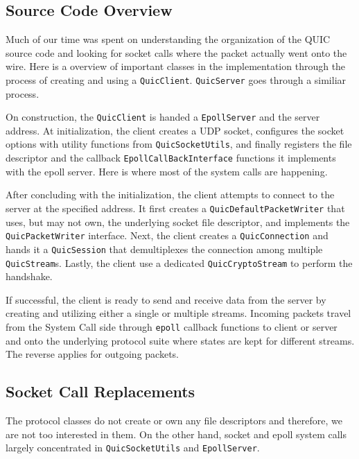 \documentclass{sig-alternate-05-2015}
\begin{document}
\subsection{Source Code Overview}
Much of our time was spent on understanding the organization of the QUIC source code and looking for socket calls where the packet actually went onto the wire. Here is a overview of important classes in the implementation through the process of creating and using a \texttt{QuicClient}. \texttt{QuicServer} goes through a similiar process.

On construction, the \texttt{QuicClient} is handed a \texttt{EpollServer} and the server address. At initialization, the client creates a UDP socket, configures the socket options with utility functions from \texttt{QuicSocketUtils}, and finally registers the file descriptor and the callback \texttt{EpollCallBackInterface} functions it implements with the epoll server. Here is where most of the system calls are happening. 

After concluding with the initialization, the client attempts to connect to the server at the specified address. It first creates a                   \texttt{QuicDefaultPacketWriter} that uses, but may not own, the underlying socket file descriptor, and implements the \texttt{QuicPacketWriter} interface. Next, the client creates a \texttt{QuicConnection} and hands it a \texttt{QuicSession} that demultiplexes the connection among multiple \texttt{QuicStream}s. Lastly, the client use a dedicated \texttt{QuicCryptoStream} to perform the handshake.

If successful, the client is ready to send and receive data from the server by creating and utilizing either a single or multiple streams. Incoming packets travel from the System Call side through \texttt{epoll} callback functions to client or server and onto the underlying protocol suite where states are kept for different streams. The reverse applies for outgoing packets.

\subsection{Socket Call Replacements}
The protocol classes do not create or own any file descriptors and therefore, we are not too interested in them. On the other hand, socket and epoll system calls largely concentrated in \texttt{QuicSocketUtils} and \texttt{EpollServer}. 

\end{document}
